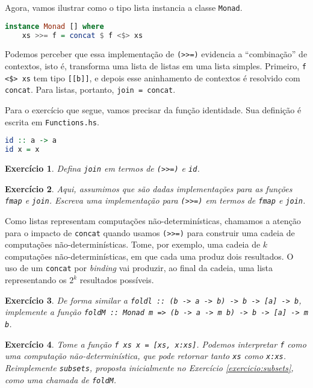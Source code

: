 \documentclass[a4paper]{article}
\newtheorem{exercicio}{Exercício}
\begin{document}
Agora, vamos ilustrar como o tipo lista instancia a classe \texttt{Monad}.

\begin{lstlisting}[language=haskell, frame=single]
instance Monad [] where
	xs >>= f = concat $ f <$> xs
\end{lstlisting}

Podemos perceber que essa implementação de \texttt{(>>=)} evidencia a ``combinação'' de contextos, isto é, transforma uma lista de listas em uma lista simples.
Primeiro, \texttt{f <\$> xs} tem tipo \texttt{[[b]]}, e depois esse aninhamento de contextos é resolvido com \texttt{concat}.
Para listas, portanto, \mbox{\texttt{join = concat}}.

Para o exercício que segue, vamos precisar da função identidade.
Sua definição é escrita em \texttt{Functions.hs}.

\begin{lstlisting}[language=haskell, frame=single]
id :: a -> a
id x = x
\end{lstlisting}

\begin{exercicio}
	Defina \emph{\texttt{join}} em termos de \emph{\texttt{(>>=)}} e \emph{\texttt{id}}.
\end{exercicio}

\begin{exercicio}
	Aqui, assumimos que são dadas implementações para as funções \mbox{\emph{\texttt{fmap}}} e \mbox{\emph{\texttt{join}}}.
	Escreva uma implementação para \emph{\texttt{(>>=)}} em termos de \emph{\texttt{fmap}} e \emph{\texttt{join}}.
\end{exercicio}

Como listas representam computações não-determinísticas, chamamos a atenção para o impacto de \texttt{concat} quando usamos \texttt{(>>=)} para construir uma cadeia de computações não-determinísticas.
Tome, por exemplo, uma cadeia de $k$ computações não-determinísticas, em que cada uma produz dois resultados.
O uso de um \texttt{concat} por \emph{binding} vai produzir, ao final da cadeia, uma lista representando os $2^k$ resultados possíveis.

\begin{exercicio} \label{exercicio:foldM}
	De forma similar a \emph{\texttt{foldl :: (b -> a -> b) -> b -> [a] -> b}}, implemente a função \emph{\texttt{foldM :: Monad m => (b -> a -> m b) -> b -> [a] -> m b}}.
\end{exercicio}

\begin{exercicio}
	Tome a função \emph{\texttt{f xs x = [xs, x:xs]}}.
	Podemos interpretar \emph{\texttt{f}} como uma computação não-determinística, que pode retornar tanto \emph{\texttt{xs}} como \emph{\texttt{x:xs}}.
	Reimplemente \emph{\texttt{subsets}}, proposta inicialmente no Exercício \ref{exercicio:subsets}, como uma chamada de \emph{\texttt{foldM}}.
\end{exercicio}
\end{document}
